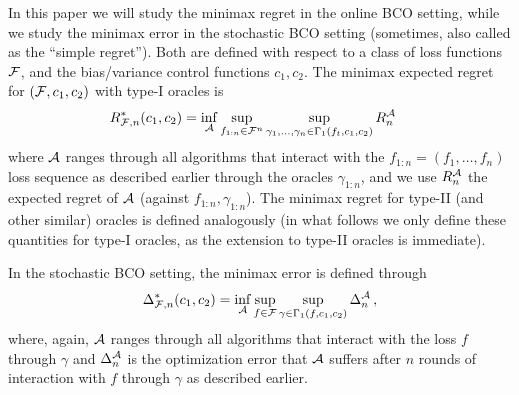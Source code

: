 In this paper we will study the minimax regret in the online BCO setting, while we study the minimax error in the stochastic BCO setting (sometimes, also called as the ``simple regret'').
Both are defined with respect to a class of loss functions $\mathcal{F}$, and the bias/variance control functions $c_1,c_2$.
The minimax expected regret for $(\mathcal{F},c_1,c_2)$ with type-I oracles is
\begin{align*}
R_{\F,n}^*(c_1,c_2)
&= \inf_{\cA} \sup_{f_{1:n}\in \cF^n}
	\sup_{\substack{\gamma_1,\ldots,\gamma_n \in \Gamma_1(f_t,c_1,c_2)%
	}} R_n^{\cA} %
\end{align*}
where $\mathcal{A}$ ranges through all algorithms that interact with the $f_{1:n}= (f_1,\dots,f_n)$ loss sequence
as described earlier
through the oracles $\gamma_{1:n}$,
and we use $R_n^{\mathcal{A}}$ the expected regret of $\mathcal{A}$ (against $f_{1:n},\gamma_{1:n}$).
The minimax regret for type-II (and other similar) oracles is defined analogously (in what follows we only define these quantities for type-I oracles, as the extension to type-II oracles is immediate).

In the stochastic BCO setting, the minimax error is defined through
\begin{align}
\label{eq:minimaxerrdef}
\Delta_{\F,n}^*(c_1,c_2)
= \inf_{\cA} \sup_{f \in \cF} \sup_{\gamma\in \Gamma_1(f,c_1,c_2)}  \Delta_n^{\cA}\,, %
\end{align}
where, again, $\mathcal{A}$ ranges through all algorithms that interact with the loss $f$ through $\gamma$ and
$\Delta_n^{\mathcal{A}}$ is the optimization error that $\mathcal{A}$ suffers
after $n$ rounds of interaction with $f$ through $\gamma$ as described earlier.

